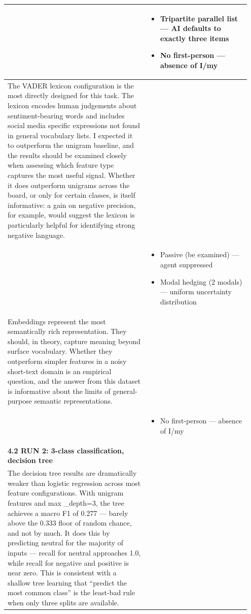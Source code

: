 \documentclass[11pt]{article}
\begin{document}
\begin{longtable}{|p{0.55\linewidth}|p{0.40\linewidth}|}
\hline
\rule[-3.5cm]{0pt}{3.5cm} & \begin{itemize}[leftmargin=1em,itemsep=1pt,topsep=1pt,parsep=0pt]
  \item Tripartite parallel list --- AI defaults to exactly three items
  \item No first-person --- absence of I/my
\end{itemize} \\
\hline
The VADER lexicon configuration is the most directly designed for this task. The lexicon encodes human judgements about sentiment-bearing words and includes social media specific expressions not found in general vocabulary lists. I expected it to outperform the unigram baseline, and the results should be examined closely when assessing which feature type captures the most useful signal. Whether it does outperform unigrams across the board, or only for certain classes, is itself informative: a gain on negative precision, for example, would suggest the lexicon is particularly helpful for identifying strong negative language. & \\[2pt]
\hline
\rule[-3.5cm]{0pt}{3.5cm} & \begin{itemize}[leftmargin=1em,itemsep=1pt,topsep=1pt,parsep=0pt]
  \item Passive (be examined) --- agent suppressed
  \item Modal hedging (2 modals) --- uniform uncertainty distribution
\end{itemize} \\
\hline
Embeddings represent the most semantically rich representation. They should, in theory, capture meaning beyond surface vocabulary. Whether they outperform simpler features in a noisy short-text domain is an empirical question, and the answer from this dataset is informative about the limits of general-purpose semantic representations. & \\[2pt]
\hline
\rule[-3.5cm]{0pt}{3.5cm} & \begin{itemize}[leftmargin=1em,itemsep=1pt,topsep=1pt,parsep=0pt]
  \item No first-person --- absence of I/my
\end{itemize} \\
\hline
\textbf{4.2 RUN 2: 3-class classification, decision tree}\\[4pt]
The decision tree results are dramatically weaker than logistic regression across most feature configurations. With unigram features and max \_depth=3, the tree achieves a macro F1 of 0.277 --- barely above the 0.333 floor of random chance, and not by much. It does this by predicting neutral for the majority of inputs --- recall for neutral approaches 1.0, while recall for negative and positive is near zero. This is consistent with a shallow tree learning that ``predict the most common class'' is the least-bad rule when only three splits are available. & \\[2pt]

\end{longtable}
\end{document}
